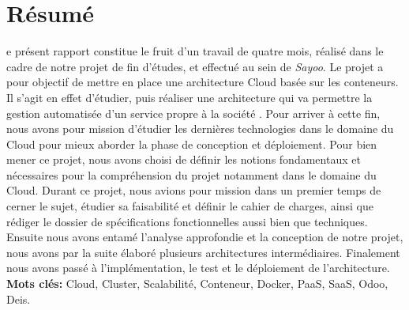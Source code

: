 
\chapter*{Résumé}
\begin{onehalfspace}
e présent rapport constitue le fruit d'un travail de quatre mois, réalisé dans le cadre de notre projet de fin d'études, et effectué au sein de \emph{Sayoo}. Le projet a pour objectif de mettre en place une architecture Cloud basée sur les conteneurs.
\newline
\newline
Il s'agit en effet d'étudier, puis réaliser une architecture qui va permettre la gestion automatisée d'un service propre à la société . Pour arriver à cette fin, nous avons pour mission d'étudier les dernières technologies dans le domaine du Cloud pour mieux aborder la phase de conception et déploiement. 
\noindent Pour bien mener ce projet, nous avons choisi de définir les notions fondamentaux et nécessaires pour la compréhension du projet notamment dans le domaine du Cloud.
\newline
\newline
Durant ce projet, nous avions pour mission dans un premier temps de cerner le sujet, étudier sa faisabilité et définir le cahier de charges, ainsi que rédiger le dossier de spécifications fonctionnelles aussi bien que techniques. Ensuite nous avons entamé l'analyse approfondie et la conception de notre projet, nous avons par la suite élaboré plusieurs architectures intermédiaires. Finalement nous avons passé à l'implémentation, le test et le déploiement de l'architecture.
\vfill{\textbf{Mots clés:} Cloud, Cluster, Scalabilité, Conteneur, Docker, PaaS, SaaS, Odoo, Deis.}
\end{onehalfspace}
